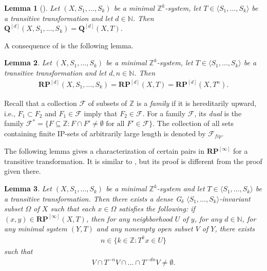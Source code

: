 \documentclass[11pt,reqno]{amsart}
\newcommand{\Z}{\mathbb{Z}}
\newcommand{\N}{\mathbb{N}}
\newcommand{\RP}{\mathbf{RP}}
\newcommand{\bQ}{\bm{Q}}
\newcommand{\cF}{{\mathcal F}}
\newtheorem{lemma}[lemma]{Lemma}
\theoremstyle{definition}
\theoremstyle{remark}
\begin{document}
\begin{lemma}[{\cite[Theorem 4.4]{Shao_Xu_saturation_R_flows:2025}}]\label{lemma: cube_G_T}
    Let $(X,S_1,\dots,S_k)$ be a minimal $\Z^k$-system, let $T\in \langle S_1,\dots,S_k \rangle$ be a transitive transformation and let $d\in \N$. Then $\bQ^{[d]}(X,S_1,\dots,S_k)=\bQ^{[d]}(X,T)$.
\end{lemma}

A consequence of {\cite[Lemma 4.1 and Theorem 4.3]{Shao_Xu_saturation_R_flows:2025}} is the following lemma.\begin{lemma}\label{lemma: RPd_G_T}
    Let $(X,S_{1},\dots,S_{k})$ be a minimal $\Z^{k}$-system, let $T\in \langle S_{1},\dots,S_{k}\rangle$ be a transitive transformation and let $d,n\in \N$. Then \begin{align*}
        \RP^{[d]}(X,S_1,\dots,S_k) = \RP^{[d]}(X,T) = \RP^{[d]}(X,T^n).
    \end{align*}
\end{lemma}

Recall that a collection $\cF$ of subsets of $\Z$ is a {\em family} if it is hereditarily upward, i.e., $F_1\subset F_2$ and $F_1\in \cF$ imply that $F_2\in \cF$. For a family $\cF$, its {\em dual} is the family $\cF^{*} =\{ F\subseteq \Z: F\cap F'\neq \emptyset \text{ for all }F'\in \cF\}$. The collection of all sets containing finite IP-sets of arbitrarily large length is denoted by $\cF_{fip}$.

The following lemma gives a characterization of certain pairs in $\RP^{[\infty]}$ for a transitive transformation. It is similar to {\cite[Theorem 7.2.7]{Huang_Shao_Ye_nilbohr_automorphy:2016}}, but its proof is different from the proof given there.

\begin{lemma}
    Let $(X,S_1,\dots,S_k)$ be a minimal $\Z^k$-system and let $T\in \langle S_1,\dots,S_k \rangle$ be a transitive transformation. Then there exists a dense G$_\delta$ $\langle S_1,\dots,S_k\rangle$-invariant subset $\Omega$ of $X$ such that  each $x\in \Omega$ satisfies the following: if $(x,y)\in \RP^{[\infty]}(X,T)$, then for any neighborhood $U$ of $y$, for any $d\in \N$, for any minimal system $(Y,T)$ and any nonempty open subset $V$ of $Y$, there exists\begin{align*}
        n\in \{k\in \Z: T^{k}x\in U\}
    \end{align*} such that\begin{align*}
        V \cap T^{-n}V\cap \dots\cap T^{-dn} V \neq \emptyset.
    \end{align*}  
\end{lemma}
\end{document}
